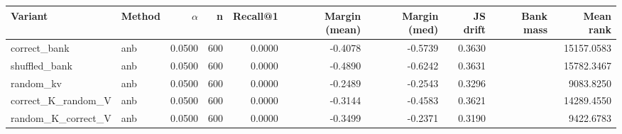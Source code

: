 \begin{tabular}{l l r r r r r r r r}
\toprule
Variant & Method & $\alpha$ & n & Recall@1 & Margin (mean) & Margin (med) & JS drift & Bank mass & Mean rank \\
\midrule
correct\_bank & anb & 0.0500 & 600 & 0.0000 & -0.4078 & -0.5739 & 0.3630 &  & 15157.0583 \\
shuffled\_bank & anb & 0.0500 & 600 & 0.0000 & -0.4890 & -0.6242 & 0.3631 &  & 15782.3467 \\
random\_kv & anb & 0.0500 & 600 & 0.0000 & -0.2489 & -0.2543 & 0.3296 &  & 9083.8250 \\
correct\_K\_random\_V & anb & 0.0500 & 600 & 0.0000 & -0.3144 & -0.4583 & 0.3621 &  & 14289.4550 \\
random\_K\_correct\_V & anb & 0.0500 & 600 & 0.0000 & -0.3499 & -0.2371 & 0.3190 &  & 9422.6783 \\
\bottomrule
\end{tabular}
